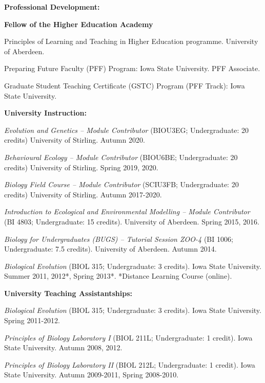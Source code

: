 \documentclass[letterpaper]{article}
\renewenvironment{itemize}{
  \begin{list}{}{
    \setlength{\leftmargin}{1.5em}
  }
}{
  \end{list}
}
\begin{document}
\hrulefill


\begin{itemize}
\item {\bf Professional Development:}
\begin{itemize}
\item[$\bullet$]{{\bf Fellow of the Higher Education Academy}}
\item[$\bullet$]{Principles of Learning and Teaching in Higher Education programme. University of Aberdeen.}
\item[$\bullet$]{Preparing Future Faculty (PFF) Program: Iowa State University. PFF Associate.}
\item[$\bullet$]{Graduate Student Teaching Certificate (GSTC) Program (PFF Track): Iowa State University.}
\end{itemize}

\item {\bf University Instruction:}
\begin{itemize}
\item[$\bullet$]{{\it Evolution and Genetics -- Module Contributor} (BIOU3EG; Undergraduate: 20 credits) University of Stirling. Autumn 2020.}
\item[$\bullet$]{{\it Behavioural Ecology -- Module Contributor} (BIOU6BE; Undergraduate: 20 credits) University of Stirling. Spring 2019, 2020.}
\item[$\bullet$]{{\it Biology Field Course -- Module Contributor} (SCIU3FB; Undergraduate: 20 credits) University of Stirling. Autumn 2017-2020.}
\item[$\bullet$]{{\it Introduction to Ecological and Environmental Modelling -- Module Contributor} (BI 4803; Undergraduate: 15 credits). University of Aberdeen. Spring 2015, 2016.}
\item[$\bullet$]{{\it Biology for Undergraduates (BUGS) -- Tutorial Session ZOO-4} (BI 1006; Undergraduate: 7.5 credits). University of Aberdeen. Autumn 2014.}
\item[$\bullet$]{{\it Biological Evolution} (BIOL 315; Undergraduate: 3 credits). Iowa State University. Summer 2011, 2012*, Spring 2013*. *Distance Learning Course (online).}
\end{itemize}

\item {\bf University Teaching Assistantships:}
\begin{itemize}
\item[$\bullet$]{{\it Biological Evolution} (BIOL 315; Undergraduate: 3 credits). Iowa State University. Spring 2011-2012.}
\item[$\bullet$]{{\it Principles of Biology Laboratory I} (BIOL 211L; Undergraduate: 1 credit). Iowa State University. Autumn 2008, 2012.}
\item[$\bullet$]{{\it Principles of Biology Laboratory II} (BIOL 212L; Undergraduate: 1 credit). Iowa State University. Autumn 2009-2011, Spring 2008-2010.}
\end{itemize}


\end{itemize}
\end{document}

